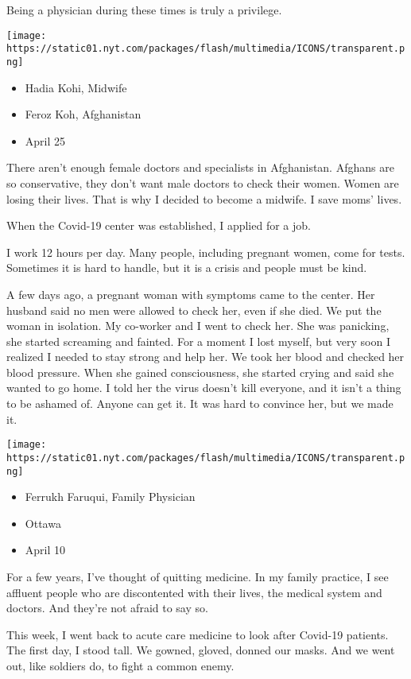 Being a physician during these times is truly a privilege.

\texttt{[image: https://static01.nyt.com/packages/flash/multimedia/ICONS/transparent.png]}

\begin{itemize}
\tightlist
\item
  Hadia Kohi, Midwife
\item
  Feroz Koh, Afghanistan
\item
  April 25
\end{itemize}

There aren't enough female doctors and specialists in Afghanistan.
Afghans are so conservative, they don't want male doctors to check their
women. Women are losing their lives. That is why I decided to become a
midwife. I save moms' lives.

When the Covid-19 center was established, I applied for a job.

I work 12 hours per day. Many people, including pregnant women, come for
tests. Sometimes it is hard to handle, but it is a crisis and people
must be kind.

A few days ago, a pregnant woman with symptoms came to the center. Her
husband said no men were allowed to check her, even if she died. We put
the woman in isolation. My co-worker and I went to check her. She was
panicking, she started screaming and fainted. For a moment I lost
myself, but very soon I realized I needed to stay strong and help her.
We took her blood and checked her blood pressure. When she gained
consciousness, she started crying and said she wanted to go home. I told
her the virus doesn't kill everyone, and it isn't a thing to be ashamed
of. Anyone can get it. It was hard to convince her, but we made it.

\texttt{[image: https://static01.nyt.com/packages/flash/multimedia/ICONS/transparent.png]}

\begin{itemize}
\tightlist
\item
  Ferrukh Faruqui, Family Physician
\item
  Ottawa
\item
  April 10
\end{itemize}

For a few years, I've thought of quitting medicine. In my family
practice, I see affluent people who are discontented with their lives,
the medical system and doctors. And they're not afraid to say so.

This week, I went back to acute care medicine to look after Covid-19
patients. The first day, I stood tall. We gowned, gloved, donned our
masks. And we went out, like soldiers do, to fight a common enemy.

